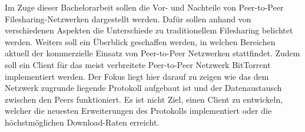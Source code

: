 Im Zuge dieser Bachelorarbeit sollen die Vor- und Nachteile von Peer-to-Peer Filesharing-Netzwerken dargestellt werden. Dafür sollen anhand von verschiedenen Aspekten die Unterschiede zu traditionellem Filesharing belichtet werden. Weiters soll ein Überblick geschaffen werden, in welchen Bereichen aktuell der kommerzielle Einsatz von Peer-to-Peer Netzwerken stattfindet.
Zudem soll ein Client für das meist verbreitete Peer-to-Peer Netzwerk BitTorrent implementiert werden. Der Fokus liegt hier darauf zu zeigen wie das dem Netzwerk zugrunde liegende Protokoll aufgebaut ist und der Datenaustausch zwischen den Peers funktioniert. Es ist nicht Ziel, einen Client zu entwickeln, welcher die neuesten Erweiterungen des Protokolls implementiert oder die höchstmöglichen Download-Raten erreicht.